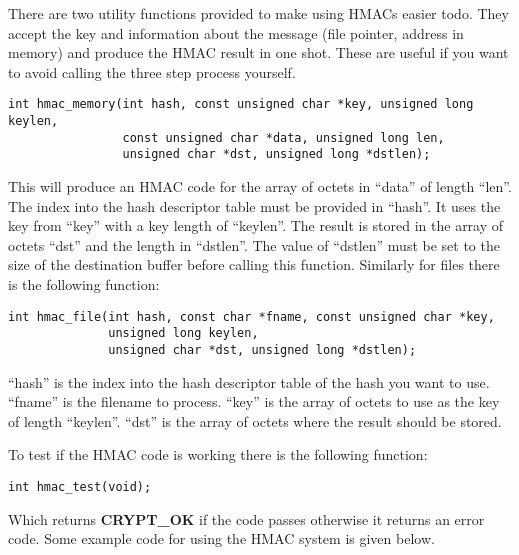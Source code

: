 \documentclass[b5paper]{book}
\begin{document}
There are two  utility functions provided to make using HMACs easier todo.  They accept the key and information about the
message (file pointer, address in memory) and produce the HMAC result in one shot.  These are useful if you want to avoid
calling the three step process yourself.

\begin{verbatim}
int hmac_memory(int hash, const unsigned char *key, unsigned long keylen,
                const unsigned char *data, unsigned long len, 
                unsigned char *dst, unsigned long *dstlen);
\end{verbatim}
This will produce an HMAC code for the array of octets in ``data'' of length ``len''.  The index into the hash descriptor 
table must be provided in ``hash''.  It uses the key from ``key'' with a key length of ``keylen''.  
The result is stored in the array of octets ``dst'' and the length in ``dstlen''.  The value of ``dstlen'' must be set
to the size of the destination buffer before calling this function.  Similarly for files there is the  following function:
\begin{verbatim}
int hmac_file(int hash, const char *fname, const unsigned char *key,
              unsigned long keylen, 
              unsigned char *dst, unsigned long *dstlen);
\end{verbatim}
``hash'' is the index into the hash descriptor table of the hash you want to use.  ``fname'' is the filename to process.  
``key'' is the array of octets to use as the key of length ``keylen''.  ``dst'' is the array of octets where the 
result should be stored.

To test if the HMAC code is working there is the following function:
\begin{verbatim}
int hmac_test(void);
\end{verbatim}
Which returns {\bf CRYPT\_OK} if the code passes otherwise it returns an error code.  Some example code for using the 
HMAC system is given below.
\end{document}
